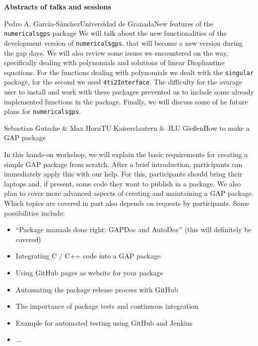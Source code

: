 \documentclass[12pt,a4paper]{article}
\begin{document}
{\noindent\huge\textbf{Abstracts of talks and sessions}} \\[1em]

\begin{Abstract}{Pedro A. García-Sánchez}{Universidad de Granada}{New features of the \texttt{numericalsgps} package}
We will talk about the new functionalities of the development version
of \texttt{numericalsgps}, that will become a new version during the gap
days. We will also review some issues we encountered on the way, specifically
dealing with polynomials and solutions of linear Diophantine equations. For
the functions dealing with polynomials we dealt with the \texttt{singular}
package, for the second we used \texttt{4ti2Interface}. The difficulty
for the avarage user to install and work with these packages prevented us
to include some already implemented functions in the package. Finally,
we will discuss some of he future plans for \texttt{numericalsgps}.
\end{Abstract}


\begin{Abstract}{Sebastian Gutsche \& Max Horn}{TU Kaiserslautern \& JLU Gießen}{How to make a GAP package}

In this hands-on workshop, we will explain the basic requirements for
creating a simple GAP package from scratch. After a brief introduction,
participants can immediately apply this with our help. For this,
participants should bring their laptops and, if present, some code they
want to publish in a package.
%
We also plan to cover more advanced aspects of creating and maintaining
a GAP package.  Which topics are covered in part also depends on requests
by participants. Some possibilities include:
\begin{itemize}[itemsep=0mm]
\item ``Package manuals done right: GAPDoc and AutoDoc'' (this will definitely be covered)
\item Integrating C / C++ code into a GAP package
\item Using GitHub pages as website for your package
\item Automating the package release process with GitHub
\item The importance of package tests and continuous integration
\item Example for automated testing using GitHub and Jenkins
\item ...
\end{itemize}

\end{Abstract}
\end{document}
